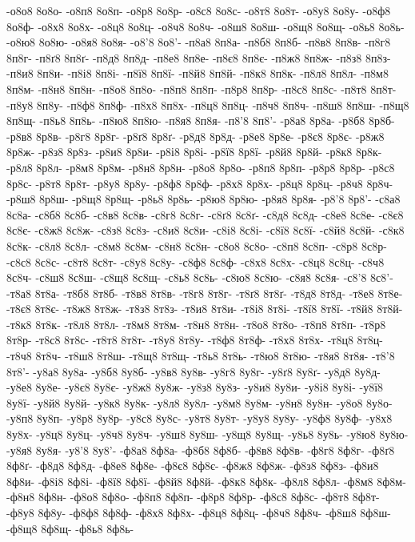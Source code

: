 {-о8о8
8о8о-
-о8п8
8о8п-
-о8р8
8о8р-
-о8с8
8о8с-
-о8т8
8о8т-
-о8у8
8о8у-
-о8ф8
8о8ф-
-о8х8
8о8х-
-о8ц8
8о8ц-
-о8ч8
8о8ч-
-о8ш8
8о8ш-
-о8щ8
8о8щ-
-о8ь8
8о8ь-
-о8ю8
8о8ю-
-о8я8
8о8я-
-о8'8
8о8'-
-п8а8
8п8а-
-п8б8
8п8б-
-п8в8
8п8в-
-п8г8
8п8г-
-п8ґ8
8п8ґ-
-п8д8
8п8д-
-п8е8
8п8е-
-п8є8
8п8є-
-п8ж8
8п8ж-
-п8з8
8п8з-
-п8и8
8п8и-
-п8і8
8п8і-
-п8ї8
8п8ї-
-п8й8
8п8й-
-п8к8
8п8к-
-п8л8
8п8л-
-п8м8
8п8м-
-п8н8
8п8н-
-п8о8
8п8о-
-п8п8
8п8п-
-п8р8
8п8р-
-п8с8
8п8с-
-п8т8
8п8т-
-п8у8
8п8у-
-п8ф8
8п8ф-
-п8х8
8п8х-
-п8ц8
8п8ц-
-п8ч8
8п8ч-
-п8ш8
8п8ш-
-п8щ8
8п8щ-
-п8ь8
8п8ь-
-п8ю8
8п8ю-
-п8я8
8п8я-
-п8'8
8п8'-
-р8а8
8р8а-
-р8б8
8р8б-
-р8в8
8р8в-
-р8г8
8р8г-
-р8ґ8
8р8ґ-
-р8д8
8р8д-
-р8е8
8р8е-
-р8є8
8р8є-
-р8ж8
8р8ж-
-р8з8
8р8з-
-р8и8
8р8и-
-р8і8
8р8і-
-р8ї8
8р8ї-
-р8й8
8р8й-
-р8к8
8р8к-
-р8л8
8р8л-
-р8м8
8р8м-
-р8н8
8р8н-
-р8о8
8р8о-
-р8п8
8р8п-
-р8р8
8р8р-
-р8с8
8р8с-
-р8т8
8р8т-
-р8у8
8р8у-
-р8ф8
8р8ф-
-р8х8
8р8х-
-р8ц8
8р8ц-
-р8ч8
8р8ч-
-р8ш8
8р8ш-
-р8щ8
8р8щ-
-р8ь8
8р8ь-
-р8ю8
8р8ю-
-р8я8
8р8я-
-р8'8
8р8'-
-с8а8
8с8а-
-с8б8
8с8б-
-с8в8
8с8в-
-с8г8
8с8г-
-с8ґ8
8с8ґ-
-с8д8
8с8д-
-с8е8
8с8е-
-с8є8
8с8є-
-с8ж8
8с8ж-
-с8з8
8с8з-
-с8и8
8с8и-
-с8і8
8с8і-
-с8ї8
8с8ї-
-с8й8
8с8й-
-с8к8
8с8к-
-с8л8
8с8л-
-с8м8
8с8м-
-с8н8
8с8н-
-с8о8
8с8о-
-с8п8
8с8п-
-с8р8
8с8р-
-с8с8
8с8с-
-с8т8
8с8т-
-с8у8
8с8у-
-с8ф8
8с8ф-
-с8х8
8с8х-
-с8ц8
8с8ц-
-с8ч8
8с8ч-
-с8ш8
8с8ш-
-с8щ8
8с8щ-
-с8ь8
8с8ь-
-с8ю8
8с8ю-
-с8я8
8с8я-
-с8'8
8с8'-
-т8а8
8т8а-
-т8б8
8т8б-
-т8в8
8т8в-
-т8г8
8т8г-
-т8ґ8
8т8ґ-
-т8д8
8т8д-
-т8е8
8т8е-
-т8є8
8т8є-
-т8ж8
8т8ж-
-т8з8
8т8з-
-т8и8
8т8и-
-т8і8
8т8і-
-т8ї8
8т8ї-
-т8й8
8т8й-
-т8к8
8т8к-
-т8л8
8т8л-
-т8м8
8т8м-
-т8н8
8т8н-
-т8о8
8т8о-
-т8п8
8т8п-
-т8р8
8т8р-
-т8с8
8т8с-
-т8т8
8т8т-
-т8у8
8т8у-
-т8ф8
8т8ф-
-т8х8
8т8х-
-т8ц8
8т8ц-
-т8ч8
8т8ч-
-т8ш8
8т8ш-
-т8щ8
8т8щ-
-т8ь8
8т8ь-
-т8ю8
8т8ю-
-т8я8
8т8я-
-т8'8
8т8'-
-у8а8
8у8а-
-у8б8
8у8б-
-у8в8
8у8в-
-у8г8
8у8г-
-у8ґ8
8у8ґ-
-у8д8
8у8д-
-у8е8
8у8е-
-у8є8
8у8є-
-у8ж8
8у8ж-
-у8з8
8у8з-
-у8и8
8у8и-
-у8і8
8у8і-
-у8ї8
8у8ї-
-у8й8
8у8й-
-у8к8
8у8к-
-у8л8
8у8л-
-у8м8
8у8м-
-у8н8
8у8н-
-у8о8
8у8о-
-у8п8
8у8п-
-у8р8
8у8р-
-у8с8
8у8с-
-у8т8
8у8т-
-у8у8
8у8у-
-у8ф8
8у8ф-
-у8х8
8у8х-
-у8ц8
8у8ц-
-у8ч8
8у8ч-
-у8ш8
8у8ш-
-у8щ8
8у8щ-
-у8ь8
8у8ь-
-у8ю8
8у8ю-
-у8я8
8у8я-
-у8'8
8у8'-
-ф8а8
8ф8а-
-ф8б8
8ф8б-
-ф8в8
8ф8в-
-ф8г8
8ф8г-
-ф8ґ8
8ф8ґ-
-ф8д8
8ф8д-
-ф8е8
8ф8е-
-ф8є8
8ф8є-
-ф8ж8
8ф8ж-
-ф8з8
8ф8з-
-ф8и8
8ф8и-
-ф8і8
8ф8і-
-ф8ї8
8ф8ї-
-ф8й8
8ф8й-
-ф8к8
8ф8к-
-ф8л8
8ф8л-
-ф8м8
8ф8м-
-ф8н8
8ф8н-
-ф8о8
8ф8о-
-ф8п8
8ф8п-
-ф8р8
8ф8р-
-ф8с8
8ф8с-
-ф8т8
8ф8т-
-ф8у8
8ф8у-
-ф8ф8
8ф8ф-
-ф8х8
8ф8х-
-ф8ц8
8ф8ц-
-ф8ч8
8ф8ч-
-ф8ш8
8ф8ш-
-ф8щ8
8ф8щ-
-ф8ь8
8ф8ь-
}
